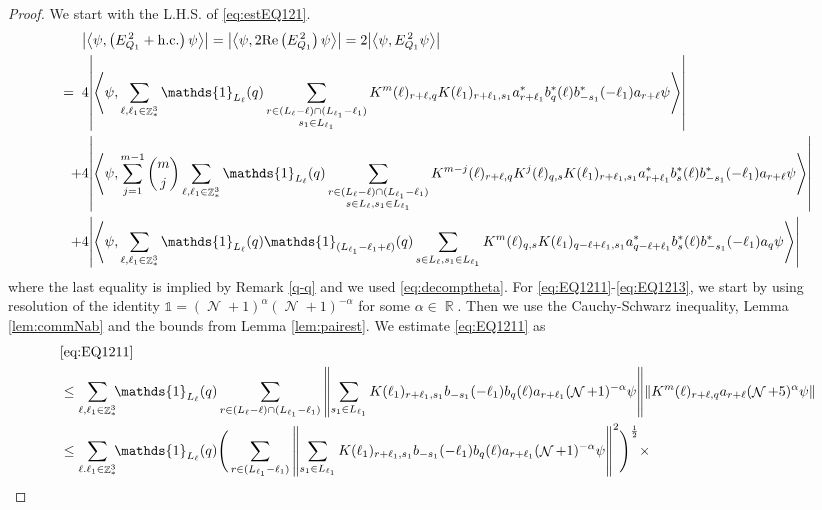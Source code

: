 \documentclass[sn-mathphys, Numbered ,a4paper]{sn-jnl}%
\DeclareMathOperator{\R}{\mathbb{R}}
\DeclareMathOperator{\Z}{\mathbb{Z}}
\DeclareMathOperator{\NN}{\mathcal{N}}
\newcommand{\half}{\frac{1}{2}}
\newcommand{\eva}[1]{\left\langle #1 \right\rangle}
\theoremstyle{plain}
\theoremstyle{definition}
\theoremstyle{remark}
\theoremstyle{plain}
\theoremstyle{definition}
\theoremstyle{remark}
\begin{document}
\begin{proof}
We start with the L.H.S. of \eqref{eq:estEQ121}.
\begin{align}
	&\abs{\eva{\psi,\left(E^{\,2}_{Q_1}+\mathrm{h.c.}\right) \psi }} = \abs{\eva{\psi,2\mathrm{Re}\left(E^{\,2}_{Q_1}\right) \psi }} = 2\abs{\eva{\psi, E^{\,2}_{Q_1} \psi }}\nonumber\\
	=\;\;&4  \abs{\eva{\psi, \sum\limits_{\ell, \ell_1\in \Z^3_*} \mathds{1}_{L_{\ell}}(q) \sum\limits_{\substack{r\in (L_{\ell}-\ell) \cap (L_{\ell_1}-\ell_1)\\ s_1\in L_{\ell_1} }} K^m(\ell )_{r+\ell,q}K(\ell_1)_{r+\ell_1,s_1}
	a^*_{r+\ell_1} b^*_{q}(\ell) b^*_{-s_1}(-\ell_1)a_{r+\ell} \psi }} \label{eq:EQ1211}\\
	\;+&4   \abs{\eva{\psi, \sum\limits_{j=1}^{m-1} {{m}\choose j} \sum\limits_{\ell, \ell_1\in \Z^3_*}\mathds{1}_{L_{\ell}}(q) \sum\limits_{\substack{r\in (L_{\ell}-\ell) \cap (L_{\ell_1}-\ell_1)\\ s \in L_{\ell},s_1\in L_{\ell_1} }} K^{m-j}(\ell)_{r+\ell,q} K^{j}(\ell)_{q,s} K(\ell_1)_{r+\ell_1,s_1} a^*_{r+\ell_1} b^*_{s}(\ell) b^*_{-s_1}(-\ell_1) a_{r+\ell} \psi }} \label{eq:EQ1212}\\
	\;+&4\abs{\eva{\psi, \sum\limits_{\ell, \ell_1\in \Z^3_*} \mathds{1}_{L_{\ell}}(q) \mathds{1}_{(L_{\ell_1}-\ell_1+\ell)}(q) \sum\limits_{s \in L_{\ell},s_1\in L_{\ell_1}}  K^m(\ell)_{q,s} K(\ell_1)_{q-\ell+\ell_1,s_1} a^*_{q-\ell+\ell_1} b^*_{s}(\ell) b^*_{-s_1}(-\ell_1) a_{q} \psi }}\label{eq:EQ1213}
\end{align}
where the last equality is implied by Remark \ref{q-q} and we used \eqref{eq:decomptheta}.
For \eqref{eq:EQ1211}-\eqref{eq:EQ1213}, we start by using resolution of the identity $\mathds{1} = (\NN+1)^{\alpha}(\NN+1)^{-\alpha}$ for some $\alpha \in \R$. Then we use the Cauchy-Schwarz inequality, Lemma \ref{lem:commNab} and the bounds from Lemma \ref{lem:pairest}. We estimate \eqref{eq:EQ1211} as
\begin{align}
	&\eqref{eq:EQ1211}\nonumber\\
	&\leq\sum\limits_{\ell,\ell_1 \in \Z^3_*} \!\!\mathds{1}_{L_\ell}(q) \sum\limits_{ r \in (L_\ell-\ell) \cap (L_{\ell_1}-\ell_1)}    \norm{\sum\limits_{s_1 \in L_{\ell_1}} K(\ell_1)_{r+\ell_1,s_1} b_{-s_1}(-\ell_1) b_{q}(\ell) a_{r+\ell_1} (\NN+1)^{-\alpha}\psi}\norm{  K^{m}(\ell)_{r+\ell,q}  a_{r+\ell} (\NN+5)^{\alpha}\psi } \nonumber\\
	&\leq \sum\limits_{\ell.\ell_1 \in \Z^3_*} \!\!\mathds{1}_{L_\ell}(q) \Bigg( \sum\limits_{r \in (L_{\ell_1}-\ell_1)} \norm{\sum\limits_{s_1 \in L_{\ell_1}} K(\ell_1)_{r+\ell_1,s_1} b_{-s_1}(-\ell_1) b_{q}(\ell) a_{r+\ell_1} (\NN+1)^{-\alpha}\psi}^2\Bigg)^\half \times\nonumber\\

\end{align}
\end{proof}
\end{document}
